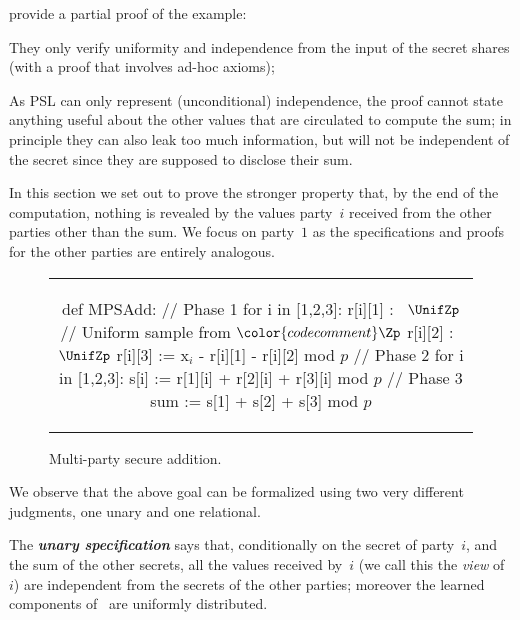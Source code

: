 \citet{barthe2019probabilistic} provide a partial proof of the example:
\begin{enumerate*}
\item
  They only verify uniformity and independence from the input of the
  secret shares  (with a proof that involves ad-hoc axioms);
\item
  As PSL can only represent (unconditional) independence,
  the proof cannot state anything
  useful about the other values  that are circulated to compute the sum;
  in principle they can also leak too much information,
  but will not be independent of the secret since they are supposed to
  disclose their sum.
\end{enumerate*}

In this section we set out to prove the stronger property that,
by the end of the computation, nothing is revealed by the values
party~$i$ received from the other parties other than the sum.
We focus on party~$1$ as the specifications and proofs for the other parties
are entirely analogous.

\begin{figure}
  \centering \begin{tabular}{c}
  \begin{sourcecode}[gobble=2]
  def MPSAdd:
    // Phase 1
    for i in [1,2,3]:
      r[i][1] :~ $\UnifZp$ // Uniform sample from $\color{codecomment}\Zp$
      r[i][2] :~ $\UnifZp$
      r[i][3] := x$_i$ - r[i][1] - r[i][2] mod $p$
    // Phase 2
    for i in [1,2,3]:
      s[i] := r[1][i] + r[2][i] + r[3][i] mod $p$
    // Phase 3
    sum := s[1] + s[2] + s[3] mod $p$
  \end{sourcecode}\end{tabular}
  \caption{Multi-party secure addition.}
  \label{fig:mpsadd}
\end{figure}


We observe that the above goal can be formalized using two
very different judgments, one unary and one relational.

\smallskip

The \textbf{\emph{unary specification}} says that,
conditionally on the secret of party~$i$, and the sum of the other secrets,
all the values received by~$i$ (we call this the \emph{view} of~$i$)
are independent from the secrets of the other parties;
moreover the learned components of~ are uniformly distributed.

